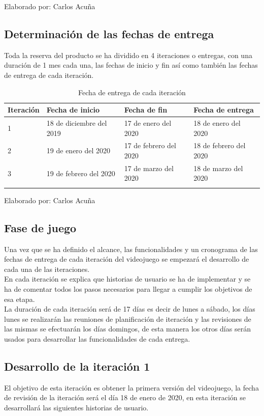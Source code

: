 \documentclass[a4paper, openright, 12pt]{report}
\begin{document}
\begin{center}
Elaborado por: Carlos Acuña
\end{center}

\subsection*{Determinación de las fechas de entrega}
\justify
Toda la reserva del producto se ha dividido en 4 iteraciones o entregas, con una duración de 1 mes cada una, las fechas de inicio y fin así como también las fechas de entrega de cada iteración.

\begin{longtable}{| l | l | l | l |}
\hline
\textbf{Iteración} & \textbf{Fecha de inicio} & \textbf{Fecha de fin} & \textbf{Fecha de entrega} \\ \hline
1 & 18 de diciembre del 2019 &
17 de enero del 2020 &
18 de enero del 2020 \\ \hline
2 & 19 de enero del 2020 &
17 de febrero del 2020 &
18 de febrero del 2020 \\ \hline
3 & 19 de febrero del 2020 &
17 de marzo del 2020 &
18 de marzo del 2020 \\ \hline
\caption{Fecha de entrega de cada iteración}
\end{longtable}
\begin{center}
Elaborado por: Carlos Acuña
\end{center}

\subsection{Fase de juego}
\justify
Una vez que se ha definido el alcance, las funcionalidades y un cronograma de las
fechas de entrega de cada iteración del videojuego se empezará el desarrollo de
cada una de las iteraciones.\\
En cada iteración se explica que historias de usuario se ha de implementar y se ha de comentar todos los pasos necesarios para llegar a cumplir los objetivos de esa etapa.\\ 
La duración de cada iteración será de 17 días es decir de lunes a sábado, los días
lunes se realizarán las reuniones de planificación de iteración y las revisiones de
las mismas se efectuarán los días domingos, de esta manera los otros días serán
usados para desarrollar las funcionalidades de cada entrega.

\subsection*{Desarrollo de la iteración 1}
\justify
El objetivo de esta iteración es obtener la primera versión del videojuego, la fecha de revisión de la iteración será el día 18 de enero de 2020, en esta iteración se desarrollará las siguientes historias de usuario.
\end{document}
